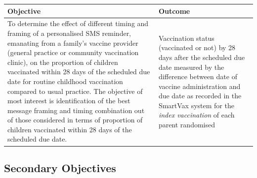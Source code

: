 \documentclass[
  bibliography=totoc]{scrreprt}
\begin{document}
\begin{tabu} to 
\toprule
Objective & Outcome\\
\midrule
To determine the effect of different timing and framing of a personalised SMS reminder, emanating from a family’s vaccine provider (general practice or community vaccination clinic), on the proportion of children vaccinated within 28 days of the scheduled due date for routine childhood vaccination compared to usual practice.
The objective of most interest is identification of the best message framing and timing combination out of those considered in terms of proportion of children vaccinated within 28 days of the scheduled due date. & Vaccination status (vaccinated or not) by 28 days after the scheduled due date measured by the difference between date of vaccine administration and due date as recorded in the SmartVax system for the \textit{index vaccination} of each parent randomised\\
\bottomrule
\end{tabu}
\endgroup{}

\hypertarget{secondary-objectives}{%
\subsection{Secondary Objectives}\label{secondary-objectives}}

\begingroup\fontsize{10}{12}\selectfont
\end{document}
